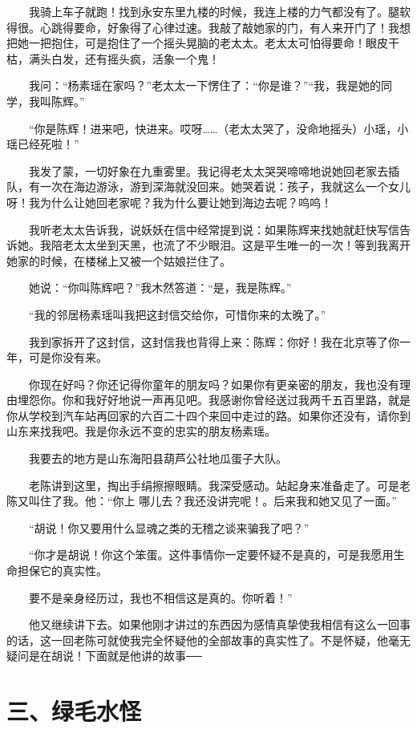  　　我骑上车子就跑！找到永安东里九楼的时候，我连上楼的力气都没有了。腿软得很。心跳得要命，好象得了心律过速。我敲了敲她家的门，有人来开门了！我想把她一把抱住，可是抱住了一个摇头晃脑的老太太。老太太可怕得要命！眼皮干枯，满头白发，还有摇头疯，活象一个鬼！ 
 
 　　我问：“杨素瑶在家吗？”老太太一下愣住了：“你是谁？”“我，我是她的同学，我叫陈辉。” 
 
 　　“你是陈辉！进来吧，快进来。哎呀……（老太太哭了，没命地摇头）小瑶，小瑶已经死啦！” 
 
 　　我发了蒙，一切好象在九重雾里。我记得老太太哭哭啼啼地说她回老家去插队，有一次在海边游泳，游到深海就没回来。她哭着说：孩子，我就这么一个女儿呀！我为什么让她回老家呢？我为什么要让她到海边去呢？呜呜！ 
 
 　　我听老太太告诉我，说妖妖在信中经常提到说：如果陈辉来找她就赶快写信告诉她。我陪老太太坐到天黑，也流了不少眼泪。这是平生唯一的一次！等到我离开她家的时候，在楼梯上又被一个姑娘拦住了。 
 
 　　她说：“你叫陈辉吧？”我木然答道：“是，我是陈辉。” 
 
 　　“我的邻居杨素瑶叫我把这封信交给你，可惜你来的太晚了。” 
 
 　　我到家拆开了这封信，这封信我也背得上来：陈辉：你好！我在北京等了你一年，可是你没有来。 
 
 　　你现在好吗？你还记得你童年的朋友吗？如果你有更亲密的朋友，我也没有理由埋怨你。你和我好好地说一声再见吧。我感谢你曾经送过我两千五百里路，就是你从学校到汽车站再回家的六百二十四个来回中走过的路。如果你还没有，请你到山东来找我吧。我是你永远不变的忠实的朋友杨素瑶。 
 
 　　我要去的地方是山东海阳县葫芦公社地瓜蛋子大队。 
 
 　　老陈讲到这里，掏出手绢擦擦眼睛。我深受感动。站起身来准备走了。可是老陈又叫住了我。他：“你上 哪儿去？我还没讲完呢！。后来我和她又见了一面。” 
 
 　　“胡说！你又要用什么显魂之类的无稽之谈来骗我了吧？” 
 
 　　“你才是胡说！你这个笨蛋。这件事情你一定要怀疑不是真的，可是我愿用生命担保它的真实性。 
 
 　　要不是亲身经历过，我也不相信这是真的。你听着！” 
 
 　　他又继续讲下去。如果他刚才讲过的东西因为感情真挚使我相信有这么一回事的话，这一回老陈可就使我完全怀疑他的全部故事的真实性了。不是怀疑，他毫无疑问是在胡说！下面就是他讲的故事── 

\section{三、绿毛水怪} 

